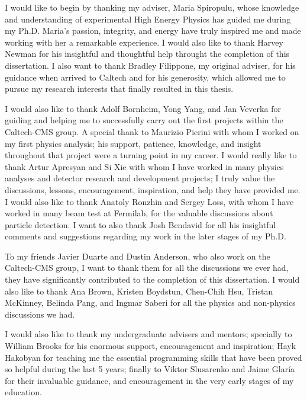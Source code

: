 \documentclass[14pt]{caltech_thesis}
\begin{document}
\par\vspace*{.2\textheight}{\centering To my parents, brother, wife, and son\par}
\clearpage
\begin{acknowledgements} 	 
  I would like to begin by thanking my adviser, Maria Spiropulu, whose
  knowledge and understanding of experimental High Energy Physics has
  guided me during my Ph.D. Maria's passion, integrity, and energy have
  truly inspired me and made working with her a remarkable
  experience. I would also like to thank Harvey Newman for his
  insightful and thoughtful help throught the completion of this
  dissertation. I also want to thank Bradley Filippone, my original
  adviser, for his guidance when arrived to Caltech and for his
  generosity, which allowed me to pursue my research interests that finally resulted in
  this thesis. 

I would also like to thank Adolf Bornheim, Yong Yang, and Jan Veverka
for guiding and helping me to successfully carry out the first projects within the
Caltech-CMS group. A special thank to Maurizio Pierini with whom I
worked on my first physics analysis; his support, patience, knowledge,
and insight 
throughout that project were a turning point in my career. I would really
like to thank Artur Apresyan and Si Xie with whom I have worked in
many physics analyses and detector research and development projects; I
truly value the discussions, lessons, encouragement, inspiration, and help they have
provided me. I would also like to thank Anatoly Ronzhin and Sergey
Loss, with whom I have worked in many beam test at Fermilab, for the
valuable discussions about particle detection. I want to also thank  Josh Bendavid for all 
his insightful comments and suggestions regarding my work in the later stages of my Ph.D.

To my friends Javier Duarte and Dustin Anderson, who also work on the
Caltech-CMS group, I want to thank them for all the discussions we ever
had, they have significantly contributed to the completion of this
dissertation. I would also like to thank Ana Brown, Kristen Boydstun,
Chen-Chih Hsu,
Tristan McKinney, Belinda Pang, and Ingmar Saberi for all the physics
and non-physics discussions we had.

I would also like to thank my undergraduate advisers and mentors; specially to William Brooks
for his enormous support, encouragement and inspiration; Hayk Hakobyan
for teaching me the essential programming skills that have been
proved so helpful during the last 5 years; finally to Viktor Slusarenko and
Jaime Glar\'ia for their invaluable guidance, and encouragement in the very early stages of my
education.



\end{acknowledgements}
\end{document}
